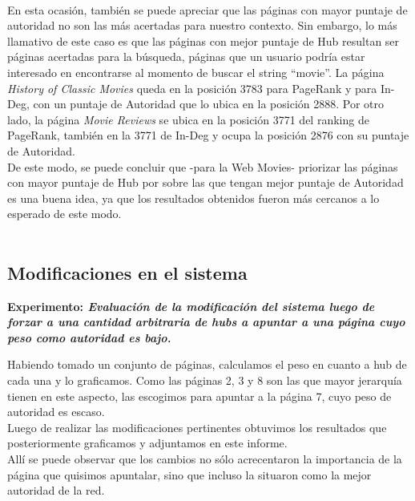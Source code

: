 \documentclass[a4paper]{article}
\begin{document}
\\
\indent En esta ocasi\'on, tambi\'en se puede apreciar que las p\'aginas con mayor puntaje de autoridad no son las m\'as acertadas para nuestro contexto. Sin embargo, lo m\'as llamativo de este caso es que las p\'aginas con mejor puntaje de Hub resultan ser p\'aginas acertadas para la b\'usqueda, p\'aginas que un usuario podr\'ia estar interesado en encontrarse al momento de buscar el string ``movie''. La p\'agina \emph{History of Classic Movies} queda en la posici\'on 3783 para PageRank y para In-Deg, con un puntaje de Autoridad que lo ubica en la posici\'on 2888. Por otro lado, la p\'agina \emph{Movie Reviews} se ubica en la posici\'on 3771 del ranking de PageRank, tambi\'en en la 3771 de In-Deg y ocupa la posici\'on 2876 con su puntaje de Autoridad.\\
\indent De este modo, se puede concluir que -para la Web Movies- priorizar las p\'aginas con mayor puntaje de Hub por sobre las que tengan mejor puntaje de Autoridad es una buena idea, ya que los resultados obtenidos fueron m\'as cercanos a lo esperado de este modo.\\
\\
\newpage
\subsection{Modificaciones en el sistema}

\textbf{Experimento: \itshape{Evaluación de la modificación del sistema luego de forzar a una cantidad arbitraria de hubs a apuntar a una página cuyo peso como autoridad es bajo. }}

Habiendo tomado un conjunto de páginas, calculamos el peso en cuanto a hub de cada una y lo graficamos. Como las páginas 2, 3 y 8 son las que mayor jerarquía tienen en este aspecto, las escogimos para apuntar a la página 7, cuyo peso de autoridad es escaso.\\
Luego de realizar las modificaciones pertinentes obtuvimos los resultados que posteriormente graficamos y adjuntamos en este informe.\\
Allí se puede observar que los cambios no sólo acrecentaron la importancia de la página que quisimos apuntalar, sino que incluso la situaron como la mejor autoridad de la red.
\end{document}
